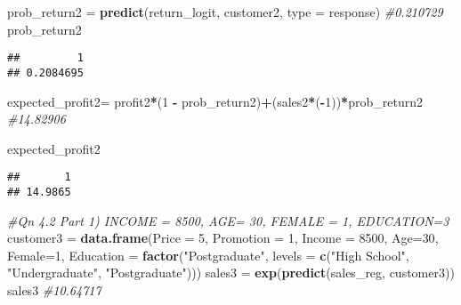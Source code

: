 \documentclass[
]{article}
\newenvironment{Shaded}{\begin{snugshade}}{\end{snugshade}}
\newcommand{\AttributeTok}[1]{\textcolor[rgb]{0.13,0.29,0.53}{#1}}
\newcommand{\CommentTok}[1]{\textcolor[rgb]{0.56,0.35,0.01}{\textit{#1}}}
\newcommand{\DecValTok}[1]{\textcolor[rgb]{0.00,0.00,0.81}{#1}}
\newcommand{\FunctionTok}[1]{\textcolor[rgb]{0.13,0.29,0.53}{\textbf{#1}}}
\newcommand{\NormalTok}[1]{#1}
\newcommand{\OtherTok}[1]{\textcolor[rgb]{0.56,0.35,0.01}{#1}}
\newcommand{\SpecialCharTok}[1]{\textcolor[rgb]{0.81,0.36,0.00}{\textbf{#1}}}
\newcommand{\StringTok}[1]{\textcolor[rgb]{0.31,0.60,0.02}{#1}}
\begin{document}
\begin{Shaded}
\begin{Highlighting}[]
\NormalTok{prob\_return2 }\OtherTok{=} \FunctionTok{predict}\NormalTok{(return\_logit, customer2, }\AttributeTok{type =} \StringTok{\textquotesingle{}response\textquotesingle{}}\NormalTok{) }\CommentTok{\#0.210729 }
\NormalTok{prob\_return2}
\end{Highlighting}
\end{Shaded}

\begin{verbatim}
##         1 
## 0.2084695
\end{verbatim}

\begin{Shaded}
\begin{Highlighting}[]
\NormalTok{expected\_profit2}\OtherTok{=}\NormalTok{ profit2}\SpecialCharTok{*}\NormalTok{(}\DecValTok{1} \SpecialCharTok{{-}}\NormalTok{ prob\_return2)}\SpecialCharTok{+}\NormalTok{(sales2}\SpecialCharTok{*}\NormalTok{(}\SpecialCharTok{{-}}\DecValTok{1}\NormalTok{))}\SpecialCharTok{*}\NormalTok{prob\_return2 }\CommentTok{\#14.82906 }


\NormalTok{expected\_profit2 }
\end{Highlighting}
\end{Shaded}

\begin{verbatim}
##       1 
## 14.9865
\end{verbatim}

\begin{Shaded}
\begin{Highlighting}[]
\CommentTok{\#Qn 4.2 Part 1) INCOME = 8500, AGE= 30, FEMALE = 1, EDUCATION=3}
\NormalTok{customer3 }\OtherTok{=} \FunctionTok{data.frame}\NormalTok{(}\AttributeTok{Price =} \DecValTok{5}\NormalTok{, }\AttributeTok{Promotion =} \DecValTok{1}\NormalTok{, }\AttributeTok{Income =} \DecValTok{8500}\NormalTok{, }\AttributeTok{Age=}\DecValTok{30}\NormalTok{, }\AttributeTok{Female=}\DecValTok{1}\NormalTok{, }\AttributeTok{Education =} \FunctionTok{factor}\NormalTok{(}\StringTok{"Postgraduate"}\NormalTok{, }\AttributeTok{levels =} \FunctionTok{c}\NormalTok{(}\StringTok{"High School"}\NormalTok{, }\StringTok{"Undergraduate"}\NormalTok{, }\StringTok{"Postgraduate"}\NormalTok{)))}
\NormalTok{sales3 }\OtherTok{=} \FunctionTok{exp}\NormalTok{(}\FunctionTok{predict}\NormalTok{(sales\_reg, customer3))}
\NormalTok{sales3 }\CommentTok{\#10.64717 }
\end{Highlighting}
\end{Shaded}
\end{document}

